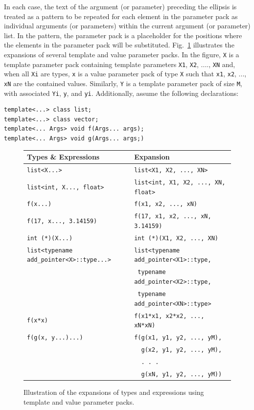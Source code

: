 \documentclass{article}
\begin{document}
In each case, the text of the argument (or parameter) preceding the
ellipsis is treated as a pattern to be repeated for each element in
the parameter pack as individual arguments (or parameters) within the
current argument (or parameter) list. In the pattern, the parameter
pack is a placeholder for the positions where the elements in the
parameter pack will be substituted. Fig.~\ref{fig:expansions}
illustrates the expansions of several template and value parameter
packs. In the figure, \texttt{X} is a template parameter pack
containing template parameters \texttt{X1}, \texttt{X2}, ....,
\texttt{XN} and, when all \texttt{Xi} are types, \texttt{x} is a value
parameter pack of type \texttt{X} such that \texttt{x1}, \texttt{x2},
..., \texttt{xN} are the contained values. Similarly, \texttt{Y} is a
template parameter pack of size \texttt{M}, with associated
\texttt{Yi}, \texttt{y}, and \texttt{yi}. Additionally, assume the
following declarations:
\begin{verbatim}
template<...> class list;
template<...> class vector;
template<... Args> void f(Args... args);
template<... Args> void g(Args... args;)
\end{verbatim}

\begin{figure}[h]
\centering
\begin{tabular}{l|l}
\textbf{Types \& Expressions} & \textbf{Expansion} \\\hline
\texttt{list<X...>} & \texttt{list<X1, X2, ..., XN>} \\
\texttt{list<int, X..., float>} & \texttt{list<int, X1, X2, ..., XN,
  float>} \\
\texttt{f(x...)} & \texttt{f(x1, x2, ..., xN)} \\
\texttt{f(17, x..., 3.14159)} & \texttt{f(17, x1, x2, ..., xN,
  3.14159)} \\
\texttt{int (*)(X...)} & \texttt{int (*)(X1, X2, ..., XN)} \\
\texttt{list<typename add\_pointer<X>::type...>} &
\texttt{list<typename add\_pointer<X1>::type,} \\
& \qquad\texttt{{ }typename add\_pointer<X2>::type,} \\
& \qquad\texttt{{ }typename add\_pointer<XN>::type>} \\

\texttt{f(x*x)} & \texttt{f(x1*x1, x2*x2, ..., xN*xN)} \\
\texttt{f(g(x, y...)...)} & \texttt{f(g(x1, y1, y2, ..., yM),} \\
& \texttt{{ }{ }g(x2, y1, y2, ..., yM),} \\
& \texttt{{ }{ }. . .} \\
& \texttt{{ }{ }g(xN, y1, y2, ..., yM))} \\
\end{tabular}
\caption{Illustration of the expansions of types and
  expressions using template and value parameter packs.}
\label{fig:expansions}
\end{figure}
\end{document}
